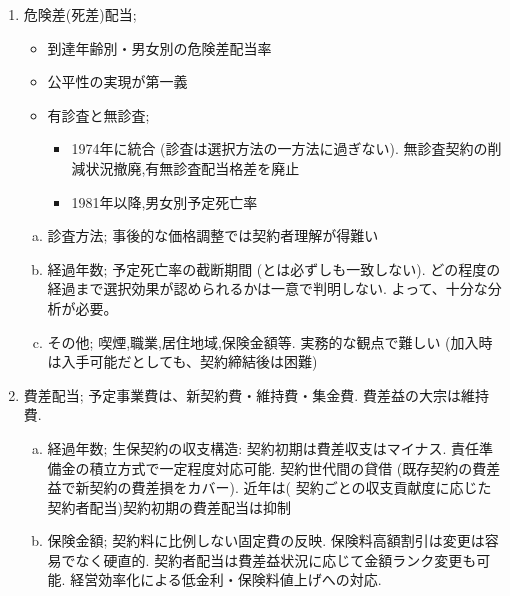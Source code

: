 \documentclass[report,gutter=10mm,fore-edge=10mm,uplatex,dvipdfmx]{jlreq}
\begin{document}
\begin{enumerate} [(1)]
\begin{enumerate} [(a)]
\begin{enumerate} [(i)]
\end{enumerate}
 \item 配当対象責任準備金
\begin{itemize}
 \item 保険料と責任準備金のどちらの基礎率で評価した責任準備金を使うか
 \item  実務的には保険料の計算基礎率により評価. 責任準備金の積立負担の調整が課題。
 \item   経過責準とすることが合理的であるが、月払いは年始年末Vの和半を用いている
\end{itemize}
\end{enumerate}
 \item 危険差(死差)配当; 
\begin{itemize}
 \item 到達年齢別・男女別の危険差配当率
 \item 公平性の実現が第一義
 \item   有診査と無診査; 
\begin{itemize}
 \item 1974年に統合 (診査は選択方法の一方法に過ぎない). 無診査契約の削減状況撤廃,有無診査配当格差を廃止
 \item 1981年以降,男女別予定死亡率
\end{itemize}
\end{itemize}
\begin{enumerate} [(a)]
 \item 診査方法; 事後的な価格調整では契約者理解が得難い
 \item 経過年数; 予定死亡率の截断期間 (とは必ずしも一致しない).   どの程度の経過まで選択効果が認められるかは一意で判明しない.   よって、十分な分析が必要。
 \item その他; 喫煙,職業,居住地域,保険金額等. 実務的な観点で難しい (加入時は入手可能だとしても、契約締結後は困難)
\end{enumerate}
 \item 費差配当; 予定事業費は、新契約費・維持費・集金費.  費差益の大宗は維持費.  
\begin{enumerate}[(a)]
 \item 経過年数;   生保契約の収支構造: 契約初期は費差収支はマイナス. 責任準備金の積立方式で一定程度対応可能. 契約世代間の貸借 (既存契約の費差益で新契約の費差損をカバー). 近年は( 契約ごとの収支貢献度に応じた契約者配当)契約初期の費差配当は抑制
 \item 保険金額; 契約料に比例しない固定費の反映. 保険料高額割引は変更は容易でなく硬直的. 契約者配当は費差益状況に応じて金額ランク変更も可能.   
経営効率化による低金利・保険料値上げへの対応.  

\end{enumerate}
\end{enumerate}
\end{document}
